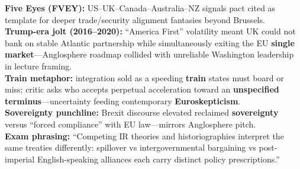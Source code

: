 \documentclass[10pt,a4paper]{article}
\begin{document}
{\textbf{Five Eyes (FVEY):} US--UK--Canada--Australia--NZ signals pact cited as template for deeper trade/security alignment fantasies beyond Brussels.\\
\textbf{Trump-era jolt (2016--2020):} ``America First'' volatility meant UK could not bank on stable Atlantic partnership while simultaneously exiting the EU \textbf{single market}---Anglosphere roadmap collided with unreliable Washington leadership in lecture framing.\\
\textbf{Train metaphor:} integration sold as a speeding \textbf{train} states must board or miss; critic asks who accepts perpetual acceleration toward an \textbf{unspecified terminus}---uncertainty feeding contemporary \textbf{Euroskepticism}.\\
\textbf{Sovereignty punchline:} Brexit discourse elevated reclaimed \textbf{sovereignty} versus ``forced compliance'' with EU law---mirrors Anglosphere pitch.\\
\textbf{Exam phrasing:} ``Competing IR theories and historiographies interpret the same treaties differently: spillover vs intergovernmental bargaining vs post-imperial English-speaking alliances each carry distinct policy prescriptions.''
}
\end{document}
